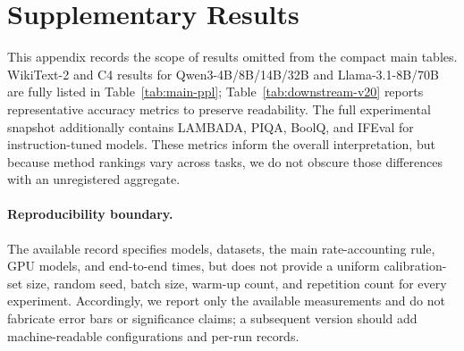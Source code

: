 \section{Supplementary Results}
\label{app:all-results}

This appendix records the scope of results omitted from the compact main tables. WikiText-2 and C4 results for Qwen3-4B/8B/14B/32B and Llama-3.1-8B/70B are fully listed in Table~\ref{tab:main-ppl}; Table~\ref{tab:downstream-v20} reports representative accuracy metrics to preserve readability.
The full experimental snapshot additionally contains LAMBADA, PIQA, BoolQ, and IFEval for instruction-tuned models. These metrics inform the overall interpretation, but because method rankings vary across tasks, we do not obscure those differences with an unregistered aggregate.

\paragraph{Reproducibility boundary.} The available record specifies models, datasets, the main rate-accounting rule, GPU models, and end-to-end times, but does not provide a uniform calibration-set size, random seed, batch size, warm-up count, and repetition count for every experiment.
Accordingly, we report only the available measurements and do not fabricate error bars or significance claims; a subsequent version should add machine-readable configurations and per-run records.
